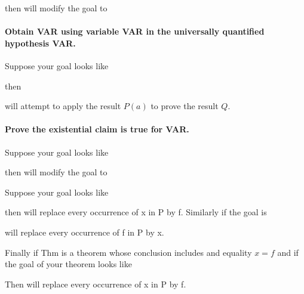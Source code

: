 then 
will modify the goal to



\paragraph{\bf Obtain VAR using variable VAR in the universally quantified hypothesis VAR.}
Suppose your goal looks like

then 


will attempt to apply the result $P(a)$ to prove the result $Q$.

\paragraph{\bf Prove the existential claim is true for VAR.}

Suppose your goal looks like

then 
will modify the goal to




Suppose your goal looks like

then 
will replace every occurrence of x in P by f. Similarly if the goal is 


will replace every occurrence of f in P by x.  

Finally if Thm is a theorem whose conclusion includes and equality $x=f$ and if the goal of your theorem looks like

 Then 
will replace every occurrence of x in P by f.  



